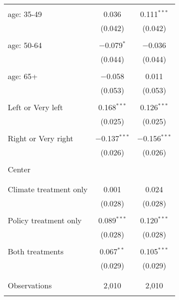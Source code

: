 \begin{tabular}{@{\extracolsep{5pt}}lcc}
  & & \\ 
 age: 35-49 & 0.036 & 0.111$^{***}$ \\ 
  & (0.042) & (0.042) \\ 
  & & \\ 
 age: 50-64 & $-$0.079$^{*}$ & $-$0.036 \\ 
  & (0.044) & (0.044) \\ 
  & & \\ 
 age: 65+ & $-$0.058 & 0.011 \\ 
  & (0.053) & (0.053) \\ 
  & & \\ 
 Left or Very left & 0.168$^{***}$ & 0.126$^{***}$ \\ 
  & (0.025) & (0.025) \\ 
  & & \\ 
 Right or Very right & $-$0.137$^{***}$ & $-$0.156$^{***}$ \\ 
  & (0.026) & (0.026) \\ 
  & & \\ 
 Center &  &  \\ 
  &  &  \\ 
  & & \\ 
 Climate treatment only & 0.001 & 0.024 \\ 
  & (0.028) & (0.028) \\ 
  & & \\ 
 Policy treatment only & 0.089$^{***}$ & 0.120$^{***}$ \\ 
  & (0.028) & (0.028) \\ 
  & & \\ 
 Both treatments & 0.067$^{**}$ & 0.105$^{***}$ \\ 
  & (0.029) & (0.029) \\ 
  & & \\ 
\hline \\[-1.8ex] 

Observations & 2,010 & 2,010 \\ 
\hline 
\hline \\[-1.8ex] 
\end{tabular} 